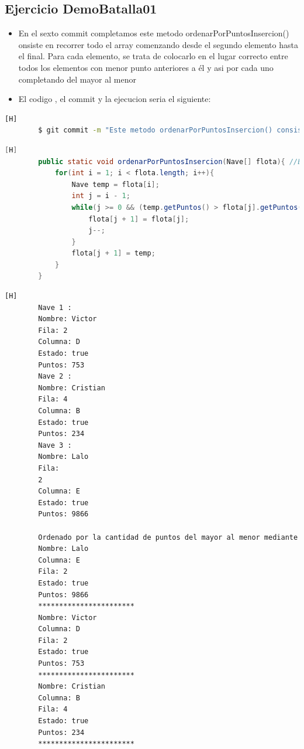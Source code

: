\documentclass{article}
\begin{document}
	\subsection{Ejercicio DemoBatalla01}
	\begin{itemize}	
		\item En el sexto commit completamos este metodo ordenarPorPuntosInsercion() onsiste en recorrer todo el array comenzando desde el segundo elemento hasta el final. Para cada elemento, se trata de colocarlo en el lugar correcto entre todos los elementos con menor punto anteriores a él y asi por cada uno completando del mayor al menor
		\item El codigo , el commit y la ejecucion seria el siguiente:
	\end{itemize}
	\begin{lstlisting}[language=bash,caption={Commit}][H]
		$ git commit -m "Este metodo ordenarPorPuntosInsercion() consiste en recorrer todo el array comenzando desde el segundo elemento hasta el final. Para cada elemento, se trata de colocarlo en el lugar correcto entre todos los elementos con menor punto anteriores a el y asi por cada uno completando del mayor al menor"
	\end{lstlisting}
	\begin{lstlisting}[language=java,caption={Las lineas de codigo del metodo creado:}][H]
		public static void ordenarPorPuntosInsercion(Nave[] flota){ //Este metodo ordenarPorPuntosInsercion() consiste en recorrer todo el array comenzando desde el segundo elemento hasta el final. Para cada elemento, se trata de colocarlo en el lugar correcto entre todos los elementos con menor punto anteriores a el y asi por cada uno completando del mayor al menor 
			for(int i = 1; i < flota.length; i++){
				Nave temp = flota[i];
				int j = i - 1;
				while(j >= 0 && (temp.getPuntos() > flota[j].getPuntos())){
					flota[j + 1] = flota[j];
					j--;
				}
				flota[j + 1] = temp;
			}
		}
	\end{lstlisting}
	\begin{lstlisting}[language=bash,caption={La ejecucion dada:}][H]
		Nave 1 : 
		Nombre: Victor
		Fila: 2
		Columna: D
		Estado: true
		Puntos: 753
		Nave 2 : 
		Nombre: Cristian
		Fila: 4
		Columna: B
		Estado: true
		Puntos: 234
		Nave 3 : 
		Nombre: Lalo
		Fila: 
		2
		Columna: E
		Estado: true
		Puntos: 9866
            
		Ordenado por la cantidad de puntos del mayor al menor mediante el metodo insercion: 
		Nombre: Lalo
		Columna: E
		Fila: 2
		Estado: true
		Puntos: 9866
		***********************
		Nombre: Victor
		Columna: D
		Fila: 2
		Estado: true
		Puntos: 753
		***********************
		Nombre: Cristian
		Columna: B
		Fila: 4
		Estado: true
		Puntos: 234
		***********************

    \end{lstlisting}
\end{document}
